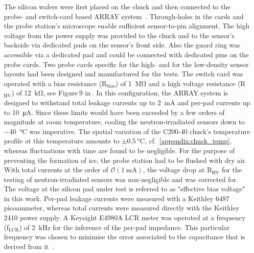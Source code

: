 The silicon wafers were first placed on the chuck and then connected to the probe- and switch-card based ARRAY system~\cite{pitters:array2019}.
Through-holes in the cards and the probe station's microscope  enable sufficient sensor-to-pin alignment. 
The high voltage from the power supply was provided to the chuck and to the sensor's backside via dedicated pads on the sensor's front side.
Also the guard ring was accessible via a dedicated pad and could be connected with dedicated pins on the probe cards.
Two probe cards specific for the high- and for the low-density sensor layouts had been designed and manufactured for the tests.
The switch card was operated with a bias resistance (R$_\text{bias}$) of \SI{1}{\mega\ohm} and a high voltage resistance (R$_\text{HV}$) of \SI{12}{\kilo\ohm}, see Figure$~$9 in$~$\cite{pitters:array2019}.
In this configuration, the ARRAY system is designed to withstand total leakage currents up to \SI{2}{\milli\ampere} and per-pad currents up to \SI{10}{\micro\ampere}.
Since these limits would have been exceeded by a few orders of magnitude at room temperature, cooling the neutron-irradiated sensors down to \SI{-40}{\celsius} was imperative.
The spatial variation of the C200-40 chuck's temperature profile at this temperature amounts to $\pm\SI{0.5}{\celsius}$, cf.~\ref{appendix:chuck_temp}, whereas fluctuations with time are found to be negligible. 
For the purpose of preventing the formation of ice, the probe station had to be flushed with dry air. 
With total currents at the order of $\mathcal{O}(\SI{1}{\milli\ampere})$, the voltage drop at R$_\text{HV}$ for the testing of neutron-irradiated sensors was non-negligible and was corrected for.
The voltage at the silicon pad under test is referred to as "effective bias voltage" in this work.
Per-pad leakage currents were measured with a Keithley 6487 picoammeter, whereas total currents were measured directly with the Keithley 2410 power supply.
A Keysight E4980A LCR meter was operated at a frequency (f$_\text{LCR}$) of \SI{2}{\kilo\hertz} for the inference of the per-pad impedance.
This particular frequency was chosen to minimise the error associated to the capacitance that is derived from it~\cite{pitters:array2019}.

